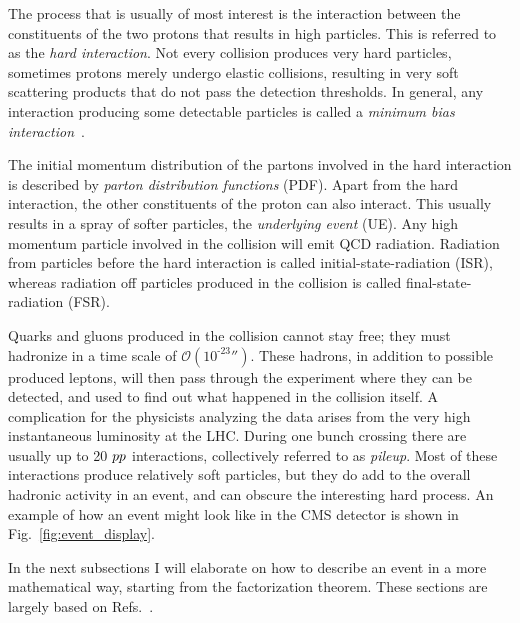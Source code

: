 The process that is usually of most interest is the interaction between the constituents of the two
protons that results in high \pt particles. This is referred to as the \textit{hard interaction}. 
Not every collision produces very hard particles, sometimes protons merely undergo elastic
collisions, resulting in very soft scattering products that do not pass the detection thresholds. In
general, any interaction producing some detectable particles is called a \textit{minimum bias
interaction}~\cite{Field:2012jv}. 

The initial momentum distribution of the partons involved in the hard interaction is described by
\textit{parton distribution functions} (PDF). 
Apart from the hard interaction, the other constituents of the proton can also interact. This
usually results in a spray of softer particles, the \textit{underlying event} (UE). 
Any high momentum particle involved in the collision will emit QCD radiation.
Radiation from particles before the hard interaction is called initial-state-radiation (ISR),
whereas radiation off particles produced in the collision is called final-state-radiation (FSR).

Quarks and gluons produced in the collision cannot stay free; they must hadronize in a time scale
of $\mathcal{O}(\text{10}^{\text{-23}}\second)$. These hadrons, in addition to possible produced
leptons, will then pass through the experiment where they can be detected, and used to find out
what happened in the collision itself. 
A complication for the physicists analyzing the data arises from the very high
instantaneous luminosity at the LHC. During one bunch crossing there are usually up to 20
${p}{p}$ interactions, collectively referred to as \textit{pileup}. Most of these interactions
produce relatively soft particles, but they do add to the overall hadronic activity in an event,
and can obscure the interesting hard process. 
An example of how an event might look like in the CMS detector is shown in
Fig.~\ref{fig:event_display}. 

In the next subsections I will elaborate on how to describe an event in a more mathematical way,
starting from the factorization theorem. These sections are largely based on
Refs.~\cite{Campbell:2006wx,Skands:2011pf,Salam_Bautzen,Salam:2010zt,Tung:2001cv}.

